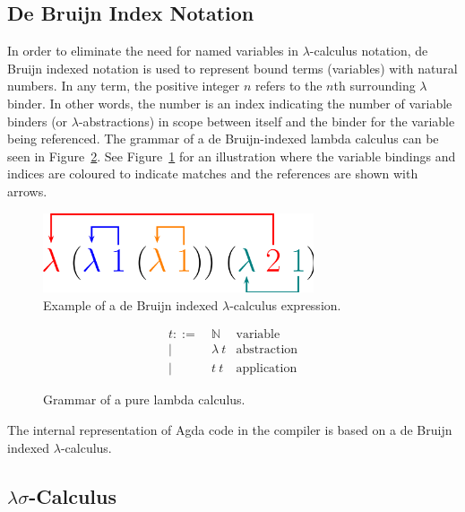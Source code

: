 \subsection{De Bruijn Index Notation}

In order to eliminate the need for named variables in $\lambda$-calculus notation, de Bruijn indexed notation is used to represent bound terms (variables) with natural numbers. In any term, the positive integer $n$ refers to the $n$th surrounding $\lambda$ binder.\cite{debruijn1972} In other words, the number is an index indicating the number of variable binders (or $\lambda$-abstractions) in scope between itself and the binder for the variable being referenced. The grammar of a de Bruijn-indexed lambda calculus can be seen in Figure~\ref{fig:db_lambda_calc}. See Figure~\ref{fig:db_example} for an illustration where the variable bindings and indices are coloured to indicate matches and the references are shown with arrows.

\begin{figure}[h]
\centering
\includegraphics[width=8cm]{Figures/DeBruijnIndex}
\caption{Example of a de Bruijn indexed $\lambda$-calculus expression.\cite{chaudhuri2009}}
\label{fig:db_example}
\end{figure}


\begin{figure}[h]
\begin{align*}
t ::=~& \mathbb{N}      & \text{variable}\\
    |~& \lambda~t       & \text{abstraction}\\
    |~& t~t             & \text{application}
\end{align*}
\caption{Grammar of a pure lambda calculus.}
\label{fig:db_lambda_calc}
\end{figure}

The internal representation of Agda code in the compiler is based on a de Bruijn indexed $\lambda$-calculus.

\subsection{$\lambda\sigma$-Calculus}

